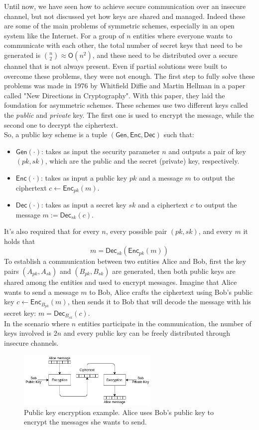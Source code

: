 Until now, we have seen how to achieve secure communication  over an insecure channel, but not discussed yet how keys are shared and managed. Indeed these are some of the main problems of symmetric schemes, especially in an open system like the Internet. For a group of $n$ entities where everyone wants to communicate with each other, the total number of secret keys that need to be generated is $\binom{n}{2} \approx \mathsf{O}(n^2)$, and these need to be distributed over a secure channel that is not always present.
Even if partial solutions were built to overcome these problems, they were not enough.
The first step to fully solve these problems was made in 1976 by Whitfield Diffie and Martin Hellman in a paper called "New Directions in Cryptography". With this paper, they laid the foundation for asymmetric schemes. These schemes use two different keys called the \emph{public} and \emph{private} key. The first one is used to encrypt the message, while the second one to decrypt the ciphertext.\\
So, a public key scheme is a tuple $(\mathsf{Gen}, \mathsf{Enc}, \mathsf{Dec})$ such that:
\begin{itemize}
    \item{$\mathsf{Gen}(\cdot)$: takes as input the security parameter $n$ and outputs a pair of key $(pk, sk)$, which are the public and the secret (private) key, respectively.}
    \item{$\mathsf{Enc}(\cdot)$: takes as input a public key $pk$ and a message $m$ to output the ciphertext $c \leftarrow \mathsf{Enc}_{pk}(m)$.}
    \item{$\mathsf{Dec}(\cdot)$: takes as input a secret key $sk$ and a ciphertext $c$ to output the message $m := \mathsf{Dec}_{sk}(c)$.}
\end{itemize}
It's also required that for every $n$, every possible pair $(pk, sk)$, and every $m$ it holds that
$$
m = \mathsf{Dec}_{sk}(\mathsf{Enc}_{pk}(m))
$$
To establish a communication between two entities Alice and Bob, first the key pairs $(A_{pk}, A_{sk})$ and $(B_{pk}, B_{sk})$ are generated, then both public keys are shared among the entities and used to encrypt messages. Imagine that Alice wants to send a message $m$ to Bob, Alice crafts the ciphertext using Bob's public key $c \leftarrow  \mathsf{Enc}_{B_{pk}}(m)$, then sends it to Bob that will decode the message with his secret key: $m = \mathsf{Dec}_{B_{sk}}(c)$.\\
In the scenario where $n$ entities participate in the communication, the number of keys involved is $2n$ and every public key can be freely distributed through insecure channels.
\begin{figure}[H]
    \centering
    \includegraphics[width=0.6\textwidth]{img/public-key/encryption.png}
    \caption[Public key encryption example]{Public key encryption example. Alice uses Bob's public key to encrypt the messages she wants to send.}
\end{figure}
